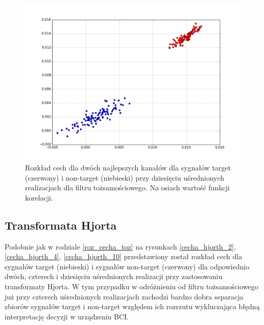 \documentclass[licencjacka,openright]{pracamgr}
\begin{document}
\begin{figure}
\centering
\includegraphics[scale=0.55, trim=10mm 15mm 10mm 18mm, clip=True]{pics/cecha_toz_10.png}
\caption{Rozkład cech dla dwóch najlepszych kanałów dla sygnałów target (czerwony) i non-target (niebieski) przy dziesięciu uśrednionych realizacjach dla filtru tożsamościowego. Na osiach wartość funkcji korelacji.}
\label{cecha_toz_10}
\end{figure}

\subsection{Transformata Hjorta}
\label{roz_cecha_hjorth}
Podobnie jak w rodziale \ref{roz_cecha_toz} na rysunkach \ref{cecha_hjorth_2}, \ref{cecha_hjorth_4}, \ref{cecha_hjorth_10} przedstawiony został rozkład cech dla sygnałów target (niebieski) i sygnałów non-target (czerwony) dla odpowiednio dwóch, czterech i dziesięciu uśrednionych realizacji przy zastosowaniu transformaty Hjorta. W tym przypadku w odróżnieniu od filtru tożsamościowego już przy czterech uśrednionych realizacjach zachodzi bardzo dobra separacja zbiorów sygnałów target i non-target względem ich rozrzutu wykluczająca błędną interpretację decyzji w urządzeniu BCI.
\end{document}
